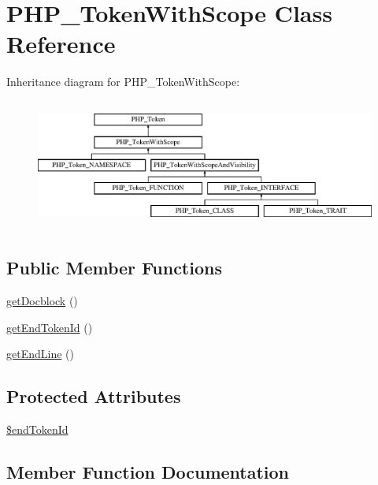\hypertarget{class_p_h_p___token_with_scope}{}\section{P\+H\+P\+\_\+\+Token\+With\+Scope Class Reference}
\label{class_p_h_p___token_with_scope}
Inheritance diagram for P\+H\+P\+\_\+\+Token\+With\+Scope\+:\begin{figure}[H]
\begin{center}
\leavevmode
\includegraphics[height=4.320988cm]{class_p_h_p___token_with_scope}
\end{center}
\end{figure}
\subsection*{Public Member Functions}
\begin{DoxyCompactItemize}
\item 
\mbox{\hyperlink{class_p_h_p___token_with_scope_ab33e13a1292cce83da13abfacf9eb982}{get\+Docblock}} ()
\item 
\mbox{\hyperlink{class_p_h_p___token_with_scope_a305594b44c2294a5d668476c7d5e690a}{get\+End\+Token\+Id}} ()
\item 
\mbox{\hyperlink{class_p_h_p___token_with_scope_a7ad149e4075bba710a8933065263fe0e}{get\+End\+Line}} ()
\end{DoxyCompactItemize}
\subsection*{Protected Attributes}
\begin{DoxyCompactItemize}
\item 
\mbox{\hyperlink{class_p_h_p___token_with_scope_a83f346e4230e0ff7cff397a6df50a9cb}{\$end\+Token\+Id}}
\end{DoxyCompactItemize}


\subsection{Member Function Documentation}
\mbox{\label{class_p_h_p___token_with_scope_ab33e13a1292cce83da13abfacf9eb982}} 
